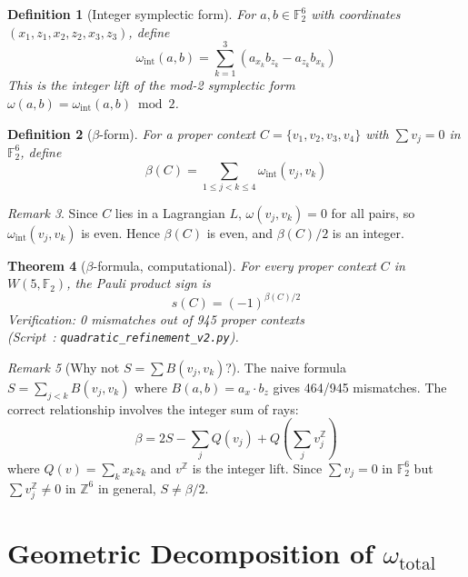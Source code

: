 \documentclass[11pt,a4paper]{article}
\newtheorem{theorem}{Theorem}[section]
\newtheorem{definition}[theorem]{Definition}
\theoremstyle{remark}
\newtheorem{remark}[theorem]{Remark}
\newcommand{\Z}{\mathbb{Z}}
\newcommand{\F}{\mathbb{F}}
\begin{document}
\begin{definition}[Integer symplectic form]
  For $a, b \in \F_2^6$ with coordinates
  $(x_1, z_1, x_2, z_2, x_3, z_3)$, define
  \[
  \omega_{\text{int}}(a, b) = \sum_{k=1}^3 (a_{x_k} b_{z_k} - a_{z_k} b_{x_k})
  \]
  This is the \emph{integer} lift of the mod-2 symplectic form
  $\omega(a, b) = \omega_{\text{int}}(a, b) \bmod 2$.
\end{definition}

\begin{definition}[$\beta$-form]
  For a proper context $C = \{v_1, v_2, v_3, v_4\}$ with
  $\sum v_j = 0$ in $\F_2^6$, define
  \[
  \beta(C) = \sum_{1 \leq j < k \leq 4} \omega_{\text{int}}(v_j, v_k)
  \]
\end{definition}

\begin{remark}
  Since $C$ lies in a Lagrangian $L$, $\omega(v_j, v_k) = 0$ for all
  pairs, so $\omega_{\text{int}}(v_j, v_k)$ is even. Hence $\beta(C)$
  is even, and $\beta(C)/2$ is an integer.
\end{remark}

\begin{theorem}[$\beta$-formula, computational]
\label{thm:beta-formula}
  For every proper context $C$ in $W(5, \F_2)$, the Pauli product sign is
  \[
  s(C) = (-1)^{\beta(C)/2}
  \]
  Verification: 0 mismatches out of 945 proper contexts
  \\(Script~\cite{PaperXIsuppl}: \texttt{quadratic\_refinement\_v2.py}).
\end{theorem}

\begin{remark}[Why not $S = \sum B(v_j, v_k)$?]
  The naive formula $S = \sum_{j<k} B(v_j, v_k)$ where
  $B(a, b) = a_x \cdot b_z$ gives 464/945 mismatches. The correct
  relationship involves the integer sum of rays:
  \[
  \beta = 2S - \sum_j Q(v_j) + Q\left(\sum_j v_j^{\Z}\right)
  \]
  where $Q(v) = \sum_k x_k z_k$ and $v^{\Z}$ is the integer lift.
  Since $\sum v_j = 0$ in $\F_2^6$ but $\sum v_j^{\Z} \neq 0$ in
  $\Z^6$ in general, $S \neq \beta/2$.
\end{remark}

\section{\texorpdfstring{Geometric Decomposition of $\omega_{\text{total}}$}{Geometric Decomposition of omega-total}}
\label{sec:decomposition}
\end{document}
